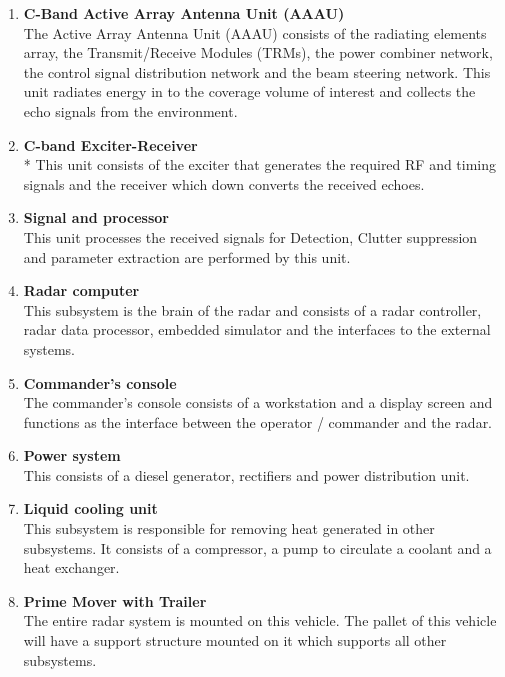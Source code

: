 \documentclass[14pt]{article} %
\begin{document}
 \begin{enumerate}
\item \textbf {C-Band Active Array Antenna Unit (AAAU)}
\\The Active Array Antenna Unit (AAAU) consists of the radiating elements array, the Transmit/Receive Modules (TRMs), the power combiner network, the control signal distribution network and the beam steering network. This unit radiates energy in to the coverage volume of interest and collects the echo signals from the environment.
\item \textbf {C-band Exciter-Receiver}  
\\*	This unit consists of the exciter that generates the required RF and timing signals and the receiver which down converts the received echoes.

\item \textbf {Signal and processor}
\\ This unit processes the received signals for Detection, Clutter suppression and parameter extraction are performed by this unit.

\item \textbf {Radar computer}
\\	This subsystem is the brain of the radar and consists of a radar controller, radar data processor, embedded simulator and the interfaces to the external systems. 

\item \textbf {Commander’s console}
\\	The commander’s console consists of a workstation and a display screen and functions as the interface between the operator / commander and the radar.

\item \textbf {Power system}
\\	This consists of a diesel generator, rectifiers and power distribution unit.

\item \textbf {Liquid cooling unit}
\\	This subsystem is responsible for removing heat generated in other subsystems. It consists of a compressor, a pump to circulate a coolant and a heat exchanger.

\item \textbf {Prime Mover with Trailer}
\\	The entire radar system is mounted on this vehicle. The pallet of this vehicle will have a support structure mounted on it which supports all other subsystems.


\end{enumerate}
\end{document}
